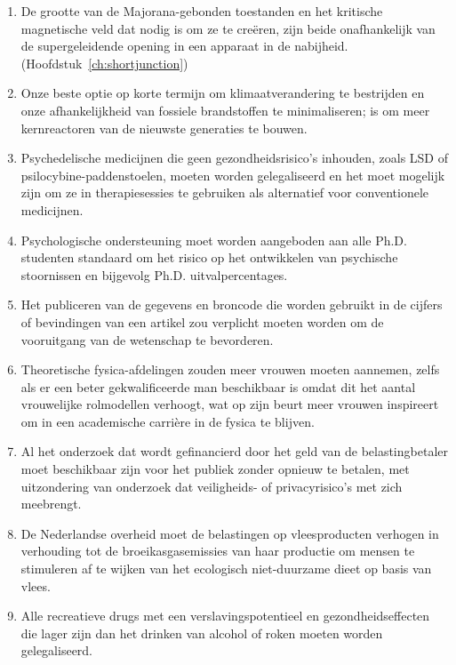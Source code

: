 \documentclass{dissertation}
\begin{document}
{\begin{enumerate}
\item De grootte van de Majorana-gebonden toestanden en het kritische magnetische veld dat nodig is om ze te creëren, zijn beide onafhankelijk van de supergeleidende opening in een apparaat in de nabijheid. (Hoofdstuk~\ref{ch:shortjunction})

\item Onze beste optie op korte termijn om klimaatverandering te bestrijden en onze afhankelijkheid van fossiele brandstoffen te minimaliseren; is om meer kernreactoren van de nieuwste generaties te bouwen.

\item Psychedelische medicijnen die geen gezondheidsrisico's inhouden, zoals LSD of psilocybine-paddenstoelen, moeten worden gelegaliseerd en het moet mogelijk zijn om ze in therapiesessies te gebruiken als alternatief voor conventionele medicijnen.

\item Psychologische ondersteuning moet worden aangeboden aan alle Ph.D. studenten standaard om het risico op het ontwikkelen van psychische stoornissen en bijgevolg Ph.D. uitvalpercentages.

\item Het publiceren van de gegevens en broncode die worden gebruikt in de cijfers of bevindingen van een artikel zou verplicht moeten worden om de vooruitgang van de wetenschap te bevorderen.

\item Theoretische fysica-afdelingen zouden meer vrouwen moeten aannemen, zelfs als er een beter gekwalificeerde man beschikbaar is omdat dit het aantal vrouwelijke rolmodellen verhoogt, wat op zijn beurt meer vrouwen inspireert om in een academische carrière in de fysica te blijven.

\item Al het onderzoek dat wordt gefinancierd door het geld van de belastingbetaler moet beschikbaar zijn voor het publiek zonder opnieuw te betalen, met uitzondering van onderzoek dat veiligheids- of privacyrisico's met zich meebrengt.

\item De Nederlandse overheid moet de belastingen op vleesproducten verhogen in verhouding tot de broeikasgasemissies van haar productie om mensen te stimuleren af te wijken van het ecologisch niet-duurzame dieet op basis van vlees.

\item Alle recreatieve drugs met een verslavingspotentieel en gezondheidseffecten die lager zijn dan het drinken van alcohol of roken moeten worden gelegaliseerd.


\end{enumerate}}
\end{document}
